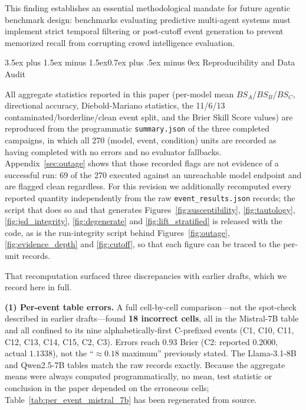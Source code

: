\documentclass[11pt,journal,onecolumn]{IEEEtran}
\makeatletter
\renewcommand\subsection{\@startsection{subsection}{2}{\z@}%
  {3.5ex plus 1.5ex minus 1.5ex}{0.7ex plus .5ex minus 0ex}%
  {\normalfont\normalsize\bfseries}}
\makeatother
\begin{document}
This finding establishes an essential methodological mandate for future agentic benchmark design: benchmarks evaluating predictive multi-agent systems must implement strict temporal filtering or post-cutoff event generation to prevent memorized recall from corrupting crowd intelligence evaluation.

\subsection{Reproducibility and Data Audit}
\label{sec:data_audit}

All aggregate statistics reported in this paper (per-model mean $BS_A$/$BS_B$/$BS_C$, directional accuracy, Diebold-Mariano statistics, the 11/6/13 contaminated/borderline/clean event split, and the Brier Skill Score values) are reproduced from the programmatic \texttt{summary.json} of the three completed campaigns, in which all 270 (model, event, condition) units are recorded as having completed with no errors and no evaluator fallbacks. Appendix~\ref{sec:outage} shows that those recorded flags are not evidence of a successful run: 69 of the 270 executed against an unreachable model endpoint and are flagged clean regardless. For this revision we additionally recomputed every reported quantity independently from the raw \texttt{event\_results.json} records; the script that does so and that generates Figures~\ref{fig:susceptibility}, \ref{fig:tautology}, \ref{fig:jsd_integrity}, \ref{fig:degenerate} and \ref{fig:lift_stratified} is released with the code, as is the run-integrity script behind Figures~\ref{fig:outage}, \ref{fig:evidence_depth} and \ref{fig:cutoff}, so that each figure can be traced to the per-unit records.

That recomputation surfaced three discrepancies with earlier drafts, which we record here in full.

\textbf{(1) Per-event table errors.} A full cell-by-cell comparison---not the spot-check described in earlier drafts---found \textbf{18 incorrect cells}, all in the Mistral-7B table and all confined to its nine alphabetically-first C-prefixed events (C1, C10, C11, C12, C13, C14, C15, C2, C3). Errors reach $0.93$ Brier (C2: reported $0.2000$, actual $1.1338$), not the ``$\approx 0.18$ maximum'' previously stated. The Llama-3.1-8B and Qwen2.5-7B tables match the raw records exactly. Because the aggregate means were always computed programmatically, no mean, test statistic or conclusion in the paper depended on the erroneous cells; Table~\ref{tab:per_event_mistral_7b} has been regenerated from source.
\end{document}

